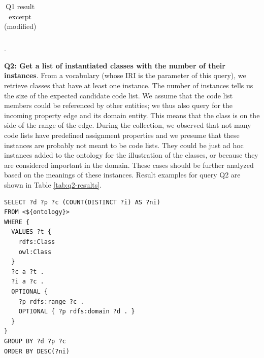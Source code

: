 \begin{table}[h]
\begin{tabular}{|l|l|r|r|}
\end{tabular}
\caption{Q1 result excerpt (modified)} \label{tab:q1-results}.
\end{table}

\medskip
\noindent\textbf{Q2: Get a list of instantiated classes with the number of their instances}. From a vocabulary (whose IRI is the parameter of this query), we retrieve classes that have at least one instance. The number of instances tells us the size of the expected candidate code list. We assume that the code list members could be referenced by other entities; we thus also query for the incoming property edge and its domain entity. This means that the class is on the side of the range of the edge. During the collection, we observed that not many code lists have predefined assignment properties and we presume that these instances are probably not meant to be code lists. They could be just ad hoc instances added to the ontology for the illustration of the classes, or because they are considered important in the domain. These cases should be further analyzed based on the meanings of these instances. Result examples for query Q2 are shown in Table \ref{tab:q2-results}.

\begin{lstlisting}[captionpos=b, caption=Q2 -- Query to get the number of instances of each class in an ontology with their range properties and domain classes,label=lst:sparql2,basicstyle=\ttfamily,frame=single]
SELECT ?d ?p ?c (COUNT(DISTINCT ?i) AS ?ni)
FROM <${ontology}> 
WHERE {
  VALUES ?t {
    rdfs:Class
    owl:Class
  }
  ?c a ?t .
  ?i a ?c .
  OPTIONAL { 
    ?p rdfs:range ?c . 
    OPTIONAL { ?p rdfs:domain ?d . }
  }
}
GROUP BY ?d ?p ?c
ORDER BY DESC(?ni)
\end{lstlisting}

